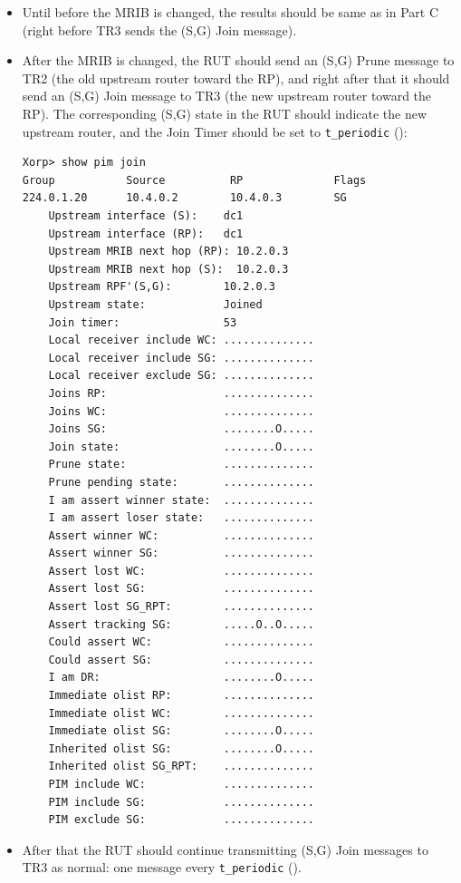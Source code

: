 \documentclass[11pt]{report}
\begin{document}
\begin{itemize}

  \item Until before the MRIB is changed, the results should
  be same as in Part C (right before TR3 sends the (S,G) Join message).

  \item After the MRIB is changed, the RUT should send an (S,G) Prune
  message to TR2 (the old upstream router toward the RP), and right after that
  it should send an (S,G) Join message to TR3 (the new upstream router
  toward the RP). The corresponding (S,G) state in the RUT should
  indicate the new upstream router, and the Join Timer should be set
  to \verb=t_periodic= ({\PimsmTPeriodic}):

\begin{verbatim}
Xorp> show pim join 
Group           Source          RP              Flags
224.0.1.20      10.4.0.2        10.4.0.3        SG   
    Upstream interface (S):    dc1
    Upstream interface (RP):   dc1
    Upstream MRIB next hop (RP): 10.2.0.3
    Upstream MRIB next hop (S):  10.2.0.3
    Upstream RPF'(S,G):        10.2.0.3
    Upstream state:            Joined 
    Join timer:                53
    Local receiver include WC: ..............
    Local receiver include SG: ..............
    Local receiver exclude SG: ..............
    Joins RP:                  ..............
    Joins WC:                  ..............
    Joins SG:                  ........O.....
    Join state:                ........O.....
    Prune state:               ..............
    Prune pending state:       ..............
    I am assert winner state:  ..............
    I am assert loser state:   ..............
    Assert winner WC:          ..............
    Assert winner SG:          ..............
    Assert lost WC:            ..............
    Assert lost SG:            ..............
    Assert lost SG_RPT:        ..............
    Assert tracking SG:        .....O..O.....
    Could assert WC:           ..............
    Could assert SG:           ..............
    I am DR:                   ........O.....
    Immediate olist RP:        ..............
    Immediate olist WC:        ..............
    Immediate olist SG:        ........O.....
    Inherited olist SG:        ........O.....
    Inherited olist SG_RPT:    ..............
    PIM include WC:            ..............
    PIM include SG:            ..............
    PIM exclude SG:            ..............
\end{verbatim}

  \item After that the RUT should continue transmitting 
  (S,G) Join messages to TR3 as normal: one message every \verb=t_periodic=
  ({\PimsmTPeriodic}).

\end{itemize}
\end{document}
